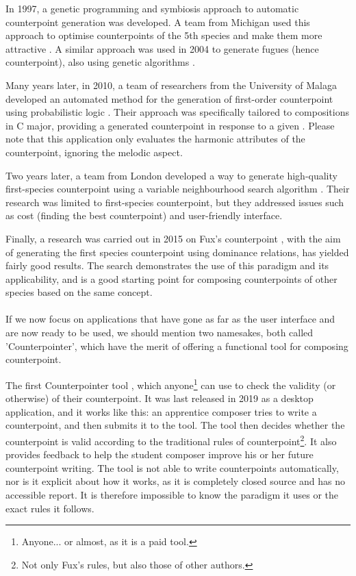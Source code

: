 In 1997, a genetic programming and symbiosis approach to automatic counterpoint generation was developed. A team from Michigan used this approach to optimise counterpoints of the 5th species and make them more attractive \cite{polito1997musica}. A similar approach was used in 2004 to generate fugues (hence counterpoint), also using genetic algorithms \cite{garay2004fugue}.  

Many years later, in 2010, a team of researchers from the University of Malaga developed an automated method for the generation of first-order counterpoint using probabilistic logic \cite{Aguilera2010}. Their approach was specifically tailored to compositions in C major, providing a generated counterpoint in response to a given \cf. Please note that this application only evaluates the harmonic attributes of the counterpoint, ignoring the melodic aspect.

Two years later, a team from London developed a way to generate high-quality first-species counterpoint using a variable neighbourhood search algorithm \cite{Herremans2012}. Their research was limited to first-species counterpoint, but they addressed issues such as cost (finding the best counterpoint) and user-friendly interface.

Finally, a research was carried out in 2015 on Fux's counterpoint \cite{komosinski2015automatic}, with the aim of generating the first species counterpoint using dominance relations, has yielded fairly good results. The search demonstrates the use of this paradigm and its applicability, and is a good starting point for composing counterpoints of other species based on the same concept.

\paragraph{}
If we now focus on applications that have gone as far as the user interface and are now ready to be used, we should mention two namesakes, both called 'Counterpointer', which have the merit of offering a functional tool for composing counterpoint.

The first Counterpointer tool \cite{counterpointer_ms}, which anyone\footnote{Anyone... or almost, as it is a paid tool.} can use to check the validity (or otherwise) of their counterpoint. It was last released in 2019 as a desktop application, and it works like this: an apprentice composer tries to write a counterpoint, and then submits it to the tool. The tool then decides whether the counterpoint is valid according to the traditional rules of counterpoint\footnote{Not only Fux's rules, but also those of other authors.}. It also provides feedback to help the student composer improve his or her future counterpoint writing. The tool is not able to write counterpoints automatically, nor is it explicit about how it works, as it is completely closed source and has no accessible report. It is therefore impossible to know the paradigm it uses or the exact rules it follows.

